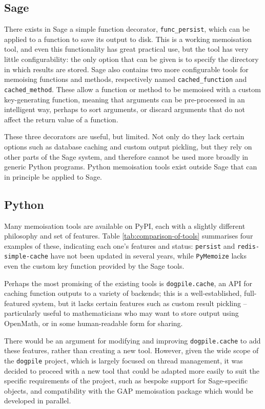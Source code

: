 \documentclass{deliverablereport}
\begin{document}
\subsection{Sage}
There exists in Sage a simple function decorator, \texttt{func\_persist}, which
can be applied to a function to save its output to disk.  This is a working
memoisation tool, and even this functionality has great practical use, but the
tool has very little configurability: the only option that can be given is to
specify the directory in which results are stored.  Sage also contains two more
configurable tools for memoising functions and methods, respectively named
\texttt{cached\_function} and \texttt{cached\_method}.  These allow a function
or method to be memoised with a custom key-generating function, meaning that
arguments can be pre-processed in an intelligent way, perhaps to sort arguments,
or discard arguments that do not affect the return value of a function.

These three decorators are useful, but limited.  Not only do they lack certain
options such as database caching and custom output pickling, but they rely on
other parts of the Sage system, and therefore cannot be used more broadly in
generic Python programs.  Python memoisation tools exist outside Sage that can
in principle be applied to Sage.

\subsection{Python}
Many memoisation tools are available on PyPI, each with a slightly different
philosophy and set of features.  Table \ref{tab:comparison-of-tools} summarises
four examples of these, indicating each one's features and status:
\texttt{persist} and \texttt{redis-simple-cache} have not been updated in
several years, while \texttt{PyMemoize} lacks even the custom key function
provided by the Sage tools.

Perhaps the most promising of the existing tools is \texttt{dogpile.cache}, an
API for caching function outputs to a variety of backends; this is a
well-established, full-featured system, but it lacks certain features such as
custom result pickling -- particularly useful to mathematicians who may want to
store output using OpenMath, or in some human-readable form for sharing.

There would be an argument for modifying and improving \texttt{dogpile.cache} to
add these features, rather than creating a new tool.  However, given the wide
scope of the \texttt{dogpile} project, which is largely focused on thread
management, it was decided to proceed with a new tool that could be adapted more
easily to suit the specific requirements of the project, such as bespoke support
for Sage-specific objects, and compatibility with the GAP memoisation package
which would be developed in parallel.
\end{document}
